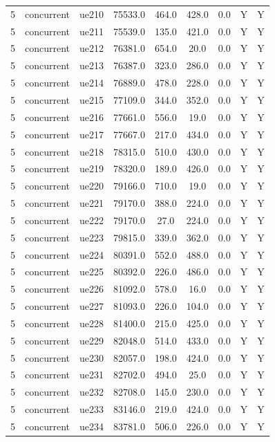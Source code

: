 \begin{table}[ht]
\begin{tabular}{|c|c|c|c|c|c|c|c|c|}
5 & concurrent & ue210 & 75533.0 & 464.0 & 428.0 & 0.0 & Y & Y \\
5 & concurrent & ue211 & 75539.0 & 135.0 & 421.0 & 0.0 & Y & Y \\
5 & concurrent & ue212 & 76381.0 & 654.0 & 20.0 & 0.0 & Y & Y \\
5 & concurrent & ue213 & 76387.0 & 323.0 & 286.0 & 0.0 & Y & Y \\
5 & concurrent & ue214 & 76889.0 & 478.0 & 228.0 & 0.0 & Y & Y \\
5 & concurrent & ue215 & 77109.0 & 344.0 & 352.0 & 0.0 & Y & Y \\
5 & concurrent & ue216 & 77661.0 & 556.0 & 19.0 & 0.0 & Y & Y \\
5 & concurrent & ue217 & 77667.0 & 217.0 & 434.0 & 0.0 & Y & Y \\
5 & concurrent & ue218 & 78315.0 & 510.0 & 430.0 & 0.0 & Y & Y \\
5 & concurrent & ue219 & 78320.0 & 189.0 & 426.0 & 0.0 & Y & Y \\
5 & concurrent & ue220 & 79166.0 & 710.0 & 19.0 & 0.0 & Y & Y \\
5 & concurrent & ue221 & 79170.0 & 388.0 & 224.0 & 0.0 & Y & Y \\
5 & concurrent & ue222 & 79170.0 & 27.0 & 224.0 & 0.0 & Y & Y \\
5 & concurrent & ue223 & 79815.0 & 339.0 & 362.0 & 0.0 & Y & Y \\
5 & concurrent & ue224 & 80391.0 & 552.0 & 488.0 & 0.0 & Y & Y \\
5 & concurrent & ue225 & 80392.0 & 226.0 & 486.0 & 0.0 & Y & Y \\
5 & concurrent & ue226 & 81092.0 & 578.0 & 16.0 & 0.0 & Y & Y \\
5 & concurrent & ue227 & 81093.0 & 226.0 & 104.0 & 0.0 & Y & Y \\
5 & concurrent & ue228 & 81400.0 & 215.0 & 425.0 & 0.0 & Y & Y \\
5 & concurrent & ue229 & 82048.0 & 514.0 & 433.0 & 0.0 & Y & Y \\
5 & concurrent & ue230 & 82057.0 & 198.0 & 424.0 & 0.0 & Y & Y \\
5 & concurrent & ue231 & 82702.0 & 494.0 & 25.0 & 0.0 & Y & Y \\
5 & concurrent & ue232 & 82708.0 & 145.0 & 230.0 & 0.0 & Y & Y \\
5 & concurrent & ue233 & 83146.0 & 219.0 & 424.0 & 0.0 & Y & Y \\
5 & concurrent & ue234 & 83781.0 & 506.0 & 226.0 & 0.0 & Y & Y \\

\end{tabular}
\end{table}
